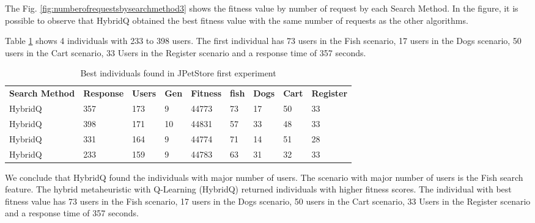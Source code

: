 \documentclass{bmcart}
\begin{document}
The Fig. \ref{fig:numberofrequestsbysearchmethod3} shows the fitness value by number of request by each Search Method. In the figure, it is possible to observe that HybridQ obtained the best fitness value with the same number of requests as the other algorithms.



Table \ref{tab:bestindividuals3} shows 4 individuals with 233 to 398 users.  The first individual has 73 users in the Fish scenario, 17 users in the Dogs scenario, 50 users in  the Cart scenario, 33 Users in the Register scenario  and a response time of 357 seconds. 

\begin{table}[h!]
\centering
\caption{Best individuals found in JPetStore first experiment}
\label{tab:bestindividuals3}
\begin{tabular}{lllllllll}
\rowcolor[HTML]{C0C0C0} 
\textbf{Search Method} & \textbf{Response} & \textbf{Users} & \textbf{Gen} & \textbf{Fitness} & \textbf{fish} & \textbf{Dogs} & \textbf{Cart} & \textbf{Register} \\
HybridQ                & 357               & 173            & 9            & 44773            & 73             & 17            & 50            & 33                \\
HybridQ                & 398               & 171            & 10           & 44831            & 57             & 33            & 48            & 33                \\
HybridQ                & 331               & 164            & 9            & 44774            & 71             & 14            & 51            & 28                \\
HybridQ                & 233               & 159            & 9            & 44783            & 63             & 31            & 32            & 33               
\end{tabular}
\end{table}

We conclude that HybridQ found the individuals with major number of users. The scenario with major number of users is the Fish search feature. The hybrid metaheuristic with Q-Learning (HybridQ) returned individuals with higher fitness scores.  The individual with best fitness value has 73 users in the Fish scenario, 17 users in the Dogs scenario, 50 users in the Cart scenario, 33 Users in the Register scenario  and a response time of 357 seconds. 
\end{document}
